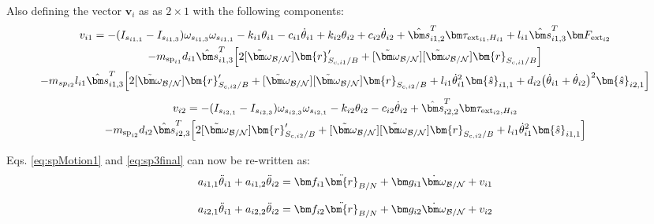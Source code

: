 Also defining the vector $\bm v_i$ as  as $2\times1$ with the following components:
\begin{multline}
	v_{i1} = - (I_{s_{i1,1}} - I_{s_{i1,3}}) \omega_{s_{i1,3}} \omega_{s_{i1,1}} - k_{i1} \theta_{i1} - c_{i1}\dot{\theta}_{i1}
	+  k_{i2} \theta_{i2} + c_{i2} \dot\theta_{i2}
	+ \hat{\bm s}_{i1,2}^T \bm \tau_{\text{ext}_{i1},H_{i1}} + l_{i1} \hat{\bm s}_{i1,3}^T \bm F_{\text{ext}_{i2}}\\
	- m_{\text{sp}_{i1}} d_{i1} \hat{\bm s}_{i1,3}^T \Big[2 [\tilde{\bm\omega}_{\cal B/N}] \bm{r}'_{S_{c,i1}/B}
	+ [\tilde{\bm\omega}_{\cal B/N}] [\tilde{\bm\omega}_{\cal B/N}] \bm{r}_{S_{c,i1}/B}\Big]
	\\
	- m_{sp_{i2}} l_{i1} \hat{\bm s}_{i1,3}^T \Big[ 2 [\tilde{\bm\omega}_{\cal B/N}] \bm{r}'_{S_{c,i2}/B}
	+ [\tilde{\bm\omega}_{\cal B/N}] [\tilde{\bm\omega}_{\cal B/N}] \bm{r}_{S_{c,i2}/B} + l_{i1} \dot{\theta}_{i1}^2 \bm{\hat{s}}_{i1,1} + d_{i2}\big(\dot{\theta}_{i1} + \dot{\theta}_{i2}\big)^2\bm{\hat{s}}_{i2,1}\Big]
	\label{eq:solar_panel_final8}
\end{multline}
\begin{multline}
	v_{i2} = - (I_{s_{i2,1}} - I_{s_{i2,3}}) \omega_{s_{i2,3}} \omega_{s_{i2,1}}
	- k_{i2} \theta_{i2} - c_{i2} \dot{\theta}_{i2} + \hat{\bm s}_{i2,2}^T \bm \tau_{\text{ext}_{i2},H_{i2}}\\
	-  m_{\text{sp}_{i2}} d_{i2} \hat{\bm s}_{i2,3}^T \Big[ 2 [\tilde{\bm\omega}_{\cal B/N}] \bm{r}'_{S_{c,i2}/B} + [\tilde{\bm\omega}_{\cal B/N}] [\tilde{\bm\omega}_{\cal B/N}] \bm{r}_{S_{c,i2}/B} + l_{i1} \dot{\theta}_{i1}^2 \bm{\hat{s}}_{i1,1} \Big]
\end{multline}

Eqs. \eqref{eq:spMotion1} and \eqref{eq:sp3final} can now be re-written as:
\begin{equation}
	a_{i1,1} \ddot\theta_{i1} +  a_{i1,2} \ddot{\theta}_{i2}=\bm f_{i1} \ddot{\bm{r}}_{B/N} + \bm g_{i1}\dot{\bm\omega}_{\cal B/N}
	+v_{i1}
	\label{eq:spMotion1Simple}
\end{equation}

\begin{equation}
	a_{i2,1} \ddot\theta_{i1}
	+ a_{i2,2}\ddot\theta_{i2} = \bm f_{i2}\ddot{\bm{r}}_{B/N} + \bm g_{i2}\dot{\bm\omega}_{\cal B/N} + v_{i2}
	\label{eq:sp3finalSimple}
\end{equation}

